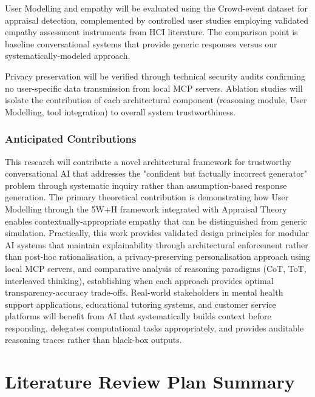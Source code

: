 \documentclass[a4paper,oneside,12pt]{book}
\numberwithin{equation}{chapter} %
\begin{document}
User Modelling and empathy will be evaluated using the Crowd-event dataset for appraisal detection, complemented by controlled user studies employing validated empathy assessment instruments from HCI literature. The comparison point is baseline conversational systems that provide generic responses versus our systematically-modeled approach.

Privacy preservation will be verified through technical security audits confirming no user-specific data transmission from local MCP servers. Ablation studies will isolate the contribution of each architectural component (reasoning module, User Modelling, tool integration) to overall system trustworthiness. 

\subsection{Anticipated Contributions}

This research will contribute a novel architectural framework for trustworthy conversational AI that addresses the "confident but factually incorrect generator" problem through systematic inquiry rather than assumption-based response generation. The primary theoretical contribution is demonstrating how User Modelling through the 5W+H framework integrated with Appraisal Theory enables contextually-appropriate empathy that can be distinguished from generic simulation. Practically, this work provides validated design principles for modular AI systems that maintain explainability through architectural enforcement rather than post-hoc rationalisation, a privacy-preserving personalisation approach using local MCP servers, and comparative analysis of reasoning paradigms (CoT, ToT, interleaved thinking), establishing when each approach provides optimal transparency-accuracy trade-offs. Real-world stakeholders in mental health support applications, educational tutoring systems, and customer service platforms will benefit from AI that systematically builds context before responding, delegates computational tasks appropriately, and provides auditable reasoning traces rather than black-box outputs.

\chapter{Literature Review Plan Summary}
\end{document}
